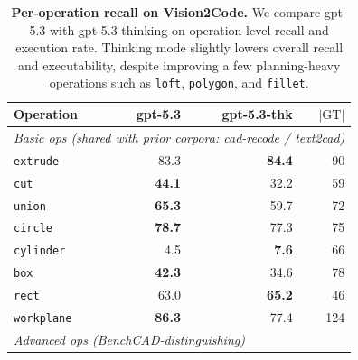 
\begin{table}[t]
    \centering
    \small
    \setlength{\tabcolsep}{4pt}
    \caption{\textbf{Per-operation recall on Vision2Code.}
    We compare gpt-5.3 with gpt-5.3-thinking on operation-level recall and execution rate.
    Thinking mode slightly lowers overall recall and executability, despite improving a few planning-heavy operations such as \texttt{loft}, \texttt{polygon}, and \texttt{fillet}.}
    \label{tab:op_recall}

    
  \begin{tabular}{lrrr}                                             
  \toprule                                                                                 
  Operation & gpt-5.3 & gpt-5.3-thk & $|\text{GT}|$ \\                                                             
  \midrule                                                                                                             
  \multicolumn{4}{l}{\emph{Basic ops (shared with prior corpora: cad-recode / text2cad)}} \\                           
  \texttt{extrude}              & 83.3          & \textbf{84.4} & 90  \\                                               
  \texttt{cut}                  & \textbf{44.1} & 32.2          & 59  \\                                               
  \texttt{union}                & \textbf{65.3} & 59.7          & 72  \\                                               
  \texttt{circle}               & \textbf{78.7} & 77.3          & 75  \\                                               
  \texttt{cylinder}             & 4.5           & \textbf{7.6}  & 66  \\                                               
  \texttt{box}                  & \textbf{42.3} & 34.6          & 78  \\                                               
  \texttt{rect}                 & 63.0          & \textbf{65.2} & 46  \\                                               
  \texttt{workplane}            & \textbf{86.3} & 77.4          & 124 \\                                               
  \midrule                                                                                                             
  \multicolumn{4}{l}{\emph{Advanced ops (BenchCAD-distinguishing)}} \\                                                 

\end{tabular}
\end{table}
